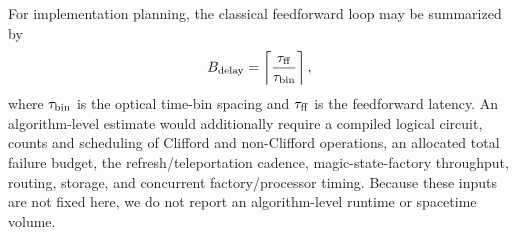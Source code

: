 \documentclass[aps,
prx,
superscriptaddress,
reprint,
longbibliography,
floatfix]{revtex4-2}
\begin{document}
For implementation planning, the classical feedforward loop may be summarized by
\begin{equation}
B_{\rm delay}=\left\lceil \frac{\tau_{\rm ff}}{\tau_{\rm bin}}\right\rceil,
\end{equation}
where $\tau_{\rm bin}$ is the optical time-bin spacing and $\tau_{\rm ff}$ is the feedforward latency. An algorithm-level estimate would additionally require a compiled logical circuit, counts and scheduling of Clifford and non-Clifford operations, an allocated total failure budget, the refresh/teleportation cadence, magic-state-factory throughput, routing, storage, and concurrent factory/processor timing. Because these inputs are not fixed here, we do not report an algorithm-level runtime or spacetime volume.


\end{document}
